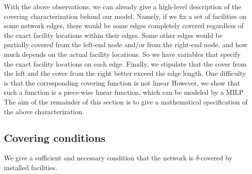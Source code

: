 With the above observations, we can already give a high-level description of the covering characterization behind our model. %
Namely, if we fix a set of facilities on some network edges, there would be some edges completely covered regardless of the exact facility locations within their edges. Some other edges would be partially covered from the left-end node and/or from the right-end node, and how much
depends on the actual facility locations. So we have variables that
specify the exact facility locations on each edge. Finally, we stipulate that the cover from the left and the cover from the right better exceed the edge length. %
One difficulty is that the corresponding covering function
is not linear %
However, we show that such a function is a piece-wise linear function, which can be modeled by a MILP. The aim of the remainder of this section is to give a mathematical  specification of the above characterization.



\subsection{Covering conditions}
We give a sufficient and necessary condition that the network is $\delta$-covered by installed facilities.
 
